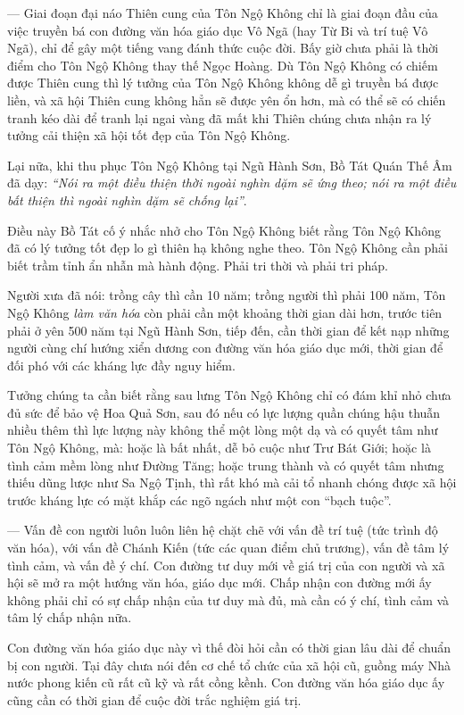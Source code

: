--- Giai đoạn đại náo Thiên cung của Tôn Ngộ Không chỉ là giai đoạn đầu của việc truyền bá con đường văn hóa giáo dục Vô Ngã (hay Từ Bi và trí tuệ Vô Ngã), chỉ để gây một tiếng vang đánh thức cuộc đời. Bấy giờ chưa phải là thời điểm cho Tôn Ngộ Không thay thế Ngọc Hoàng. Dù Tôn Ngộ Không có chiếm được Thiên cung thì lý tưởng của Tôn Ngộ Không không dễ gì truyền bá được liền, và xã hội Thiên cung không hẳn sẽ được yên ổn hơn, mà có thể sẽ có chiến tranh kéo dài để tranh lại ngai vàng đã mất khi Thiên chúng chưa nhận ra lý tưởng cải thiện xã hội tốt đẹp của Tôn Ngộ Không.

Lại nữa, khi thu phục Tôn Ngộ Không tại Ngũ Hành Sơn, Bồ Tát Quán Thế Âm đã dạy: \emph{``Nói ra một điều thiện thời ngoài nghìn dặm sẽ ứng theo; nói ra một điều bất thiện thì ngoài nghìn dặm sẽ chống lại''}.

Điều này Bồ Tát cố ý nhắc nhở cho Tôn Ngộ Không biết rằng Tôn Ngộ Không đã có lý tưởng tốt đẹp lo gì thiên hạ không nghe theo. Tôn Ngộ Không cần phải biết trầm tỉnh ẩn nhẫn mà hành động. Phải tri thời và phải tri pháp.

Người xưa đã nói: trồng cây thì cần 10 năm; trồng người thì phải 100 năm, Tôn Ngộ Không \emph{làm văn hóa} còn phải cần một khoảng thời gian dài hơn, trước tiên phải ở yên 500 năm tại Ngũ Hành Sơn, tiếp đến, cần thời gian để kết nạp những người cùng chí hướng xiển dương con đường văn hóa giáo dục mới, thời gian để đối phó với các kháng lực đầy nguy hiểm.

Tưởng chúng ta cần biết rằng sau lưng Tôn Ngộ Không chỉ có đám khỉ nhỏ chưa đủ sức để bảo vệ Hoa Quả Sơn, sau đó nếu có lực lượng quần chúng hậu thuẫn nhiều thêm thì lực lượng này không thể một lòng một dạ và có quyết tâm như Tôn Ngộ Không, mà: hoặc là bất nhất, dễ bỏ cuộc như Trư Bát Giới; hoặc là tình cảm mềm lòng như Đường Tăng; hoặc trung thành và có quyết tâm nhưng thiếu dũng lược như Sa Ngộ Tịnh, thì rất khó mà cải tổ nhanh chóng được xã hội trước kháng lực có mặt khắp các ngõ ngách như một con ``bạch tuộc''.

--- Vấn đề con người luôn luôn liên hệ chặt chẽ với vấn đề trí tuệ (tức trình độ văn hóa), với vấn đề Chánh Kiến (tức các quan điểm chủ trương), vấn đề tâm lý tình cảm, và vấn đề ý chí. Con đường tư duy mới về giá trị của con người và xã hội sẽ mở ra một hướng văn hóa, giáo dục mới. Chấp nhận con đường mới ấy không phải chỉ có sự chấp nhận của tư duy mà đủ, mà cần có ý chí, tình cảm và tâm lý chấp nhận nữa.

Con đường văn hóa giáo dục này vì thế đòi hỏi cần có thời gian lâu dài để chuẩn bị con người. Tại đây chưa nói đến cơ chế tổ chức của xã hội cũ, guồng máy Nhà nước phong kiến cũ rất cũ kỹ và rất cồng kềnh. Con đường văn hóa giáo dục ấy cũng cần có thời gian để cuộc đời trắc nghiệm giá trị.

